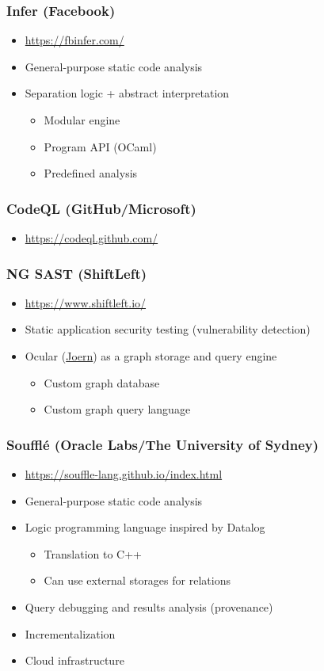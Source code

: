 \documentclass[xcolor=table,aspectratio=169]{beamer}
\begin{document}
\begin{frame}[fragile]
  \frametitle{Infer (Facebook)}  
  \begin{itemize}
    \item \url{https://fbinfer.com/}
    \item General-purpose static code analysis
    \item Separation logic + abstract interpretation
    \begin{itemize}
      \item Modular engine
      \item Program API (OCaml)
      \item Predefined analysis
    \end{itemize} 
  \end{itemize}
\end{frame}

\begin{frame}[fragile]
  \frametitle{CodeQL (GitHub/Microsoft)}
  \begin{itemize}
    \item \url{https://codeql.github.com/}
  \end{itemize}
\end{frame}

\begin{frame}[fragile]
  \frametitle{NG SAST (ShiftLeft)} 
  \begin{itemize}
    \item \url{https://www.shiftleft.io/}
    \item Static application security testing (vulnerability detection)
    \item Ocular (\href{https://joern.io/}{Joern}) as a graph storage and query engine
    \begin{itemize}
      \item Custom graph database
      \item Custom graph query language
    \end{itemize}
  \end{itemize}
\end{frame}

\begin{frame}[fragile]
  \frametitle{Souffl\'e (Oracle Labs/The University of Sydney)} 
  \begin{itemize}
    \item \url{https://souffle-lang.github.io/index.html}
    \item General-purpose static code analysis
    \item Logic programming language inspired by Datalog
    \begin{itemize}
      \item Translation to C++
      \item Can use external storages for relations
    \end{itemize}
    \pause
    \item[\faGears] Query debugging and results analysis (provenance)
    \item[\faGears] Incrementalization
    \item[\faGears] Cloud infrastructure
  \end{itemize}
\end{frame}
\end{document}
